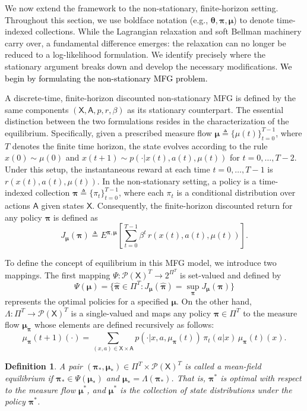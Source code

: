 \documentclass[11pt]{article}
\newcommand{\bmu}{{\boldsymbol \mu}}
\newcommand{\bpi}{{\boldsymbol \pi}}
\newcommand{\btheta}{{\boldsymbol \theta}}
\newcommand{\sX}{{\mathsf X}}
\newcommand{\sA}{{\mathsf A}}
\newcommand{\Pnew}{{\mathcal P}}
\newcommand{\tb}[1]{\textcolor{black}{#1}} %
\newtheorem{definition}{Definition}[section]
\begin{document}
We now extend the framework to the non-stationary, finite-horizon setting. Throughout this section, we use boldface notation (e.g., $\btheta, \bpi, \bmu$) to denote time-indexed collections. While the Lagrangian relaxation and soft Bellman machinery carry over, a fundamental difference emerges: the relaxation can no longer be reduced to a log-likelihood formulation. We identify precisely where the stationary argument breaks down and develop the necessary modifications. \tb{We begin by formulating the non-stationary MFG problem.}


A discrete-time, finite-horizon discounted non-stationary MFG is defined by the same components $(\sX,\sA,p,r,\beta)$ as its stationary counterpart. The essential distinction between the two formulations resides in the characterization of the equilibrium. Specifically, given a prescribed measure flow ${\bmu} \triangleq \{\mu(t)\}_{t=0}^{T-1}$, where $T$ denotes the finite time horizon, the state evolves according to the rule $x(0) \sim \mu(0)$ and $x(t+1) \sim p(\cdot|x(t),a(t),\mu(t))$ for $t=0,\ldots,T-2$. Under this setup, the instantaneous reward at each time $t=0,\ldots,T-1$ is $r(x(t),a(t),\mu(t))$. In the non-stationary setting, a policy is a time-indexed collection $\bpi \triangleq \{\pi_t\}_{t=0}^{T-1}$, where each $\pi_t$ is a conditional distribution over actions $\sA$ given states $\sX$. Consequently, the finite-horizon discounted return for any policy $\bpi$ is defined as
$$
J_{\bmu}(\bpi) \triangleq E^{\bpi,\bmu} \left[ \sum_{t=0}^{T-1} \beta^t \, r(x(t),a(t),\mu(t)) \right].
$$

To define the concept of equilibrium in this MFG model, we introduce two mappings. The first mapping $\Psi : \Pnew(\sX)^T \rightarrow 2^{\Pi^T}$ is set-valued and defined by
$$\Psi(\bmu) = \{\hat{\bpi} \in \Pi^T: J_{\bmu}(\hat{\bpi}) = \sup_{\bpi} J_{\bmu}(\bpi) \}$$
represents the optimal policies for a specified $\bmu$.
On the other hand, $\Lambda : \Pi^T \to \Pnew(\sX)^T$ is a single-valued and maps any policy $\bpi \in \Pi^T$ to the measure flow $\bmu_{\bpi}$ whose elements are defined recursively as follows:
$$
\mu_{\bpi}(t+1)(\cdot) = \sum_{(x,a) \in \sX \times \sA} p(\cdot|x,a,\mu_{\bpi}(t)) \, \pi_t(a|x) \, \mu_{\bpi}(t)(x).
$$


\begin{definition}
A pair $(\bpi_*,\bmu_*) \in \Pi^T \times \Pnew(\sX)^T$ is called a mean-field equilibrium if $\bpi_* \in \Psi(\bmu_*)$ and $\bmu_* = \Lambda(\bpi_*)$. That is, $\bpi^*$ is  optimal with respect to the measure flow $\bmu^*$, and $\bmu^*$ is the collection of state distributions under the policy $\bpi^*$.
\end{definition}
\end{document}
